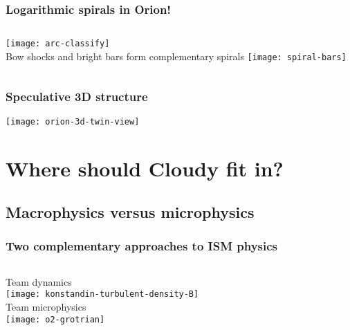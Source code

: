\documentclass[presentation]{beamer}
\begin{document}
\begin{frame}
  \frametitle{Logarithmic spirals in Orion!}
  \begin{columns}
    \texttt{[image: arc-classify]}\\
    \bigskip
    Bow shocks and bright bars form complementary spirals
    \texttt{[image: spiral-bars]}
  \end{columns}
\end{frame}

\begin{frame}
  \frametitle{Speculative 3D structure}
  \texttt{[image: orion-3d-twin-view]}
\end{frame}

\section{Where should Cloudy fit in?}

\subsection{Macrophysics versus microphysics}

\begin{frame}
  \frametitle{Two complementary approaches to ISM physics}
  \begin{columns}
    \centering
    Team dynamics\\
    \texttt{[image: konstandin-turbulent-density-B]}\\
    \centering
    Team microphysics\\
    \texttt{[image: o2-grotrian]}\\
  \end{columns}
  
\end{frame}
\end{document}
